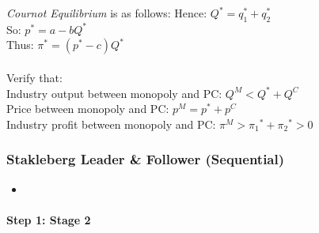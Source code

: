 \documentclass[11pt, english]{article}
\begin{document}
	\textit{Cournot Equilibrium} is as follows:
	Hence: $Q^*=q_1^*+q_2^*$\\
	So: $p^*=a-bQ^*$\\
	Thus: $\pi^*=(p^*-c)Q^*$\\

	\\

	Verify that:\\
	Industry output between monopoly and PC: $Q^M<Q^\ast+Q^C$\\
	Price between monopoly and PC: $p^M=p^\ast+p^C$\\
	Industry profit between monopoly and PC: $\pi^M>{\pi_1}^\ast+{\pi_2}^\ast>0$

		\subsubsection{Stakleberg Leader \& Follower (Sequential)}

	\begin{itemize}
	\setlength\itemsep{0cm}
		\item 
	\end{itemize}

		\paragraph{Step 1: Stage 2}





	
\end{document}
